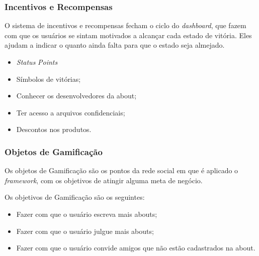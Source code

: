 \subsubsection{Incentivos e Recompensas}
\label{sub:incentives_and_rewards}
O sistema de incentivos e recompensas fecham o ciclo do \textit{dashboard}, que fazem com que
os usuários se sintam motivados a alcançar cada estado de vitória. Eles ajudam a
indicar
o quanto ainda falta para que o estado seja almejado.

\begin{itemize}
    \item \textit{Status} \textit{Points}
    \item Símbolos de vitórias;
    \item Conhecer os desenvolvedores da about;
    \item Ter acesso a arquivos confidenciais;
    \item Descontos nos produtos.
\end{itemize}

\subsubsection{Objetos de Gamificação}
\label{sec:objetodegamificacao}
Os objetos de Gamificação são os pontos da rede social em que é aplicado o \textit{framework},
com os objetivos de atingir alguma meta de negócio.

Os objetivos de Gamificação são os seguintes:

\begin{itemize}
    \item Fazer com que o usuário escreva mais abouts;
    \item Fazer com que o usuário julgue mais abouts;
    \item Fazer com que o usuário convide amigos que não estão cadastrados na about.
\end{itemize}

